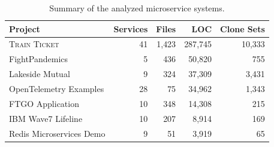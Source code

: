 \documentclass[conference]{IEEEtran}
\begin{document}
\begin{table}[tb]
\centering
\caption{Summary of the analyzed microservice systems.}
\label{tab:projects}
\begin{tabular}{lrrrr}
\toprule
Project & Services & Files & LOC & Clone Sets \\
\midrule
\textsc{Train Ticket} & 41 & 1{,}423 & 287{,}745 & 10{,}333 \\
FightPandemics & 5 & 436 & 50{,}820 & 755 \\
Lakeside Mutual & 9 & 324 & 37{,}309 & 3{,}431 \\
OpenTelemetry Examples & 28 & 75 & 34{,}962 & 1{,}343 \\
FTGO Application & 10 & 348 & 14{,}308 & 215 \\
IBM Wave7 Lifeline & 10 & 207 & 8{,}914 & 169 \\
Redis Microservices Demo & 9 & 51 & 3{,}919 & 65 \\
\bottomrule
\end{tabular}
\end{table}

\end{document}
